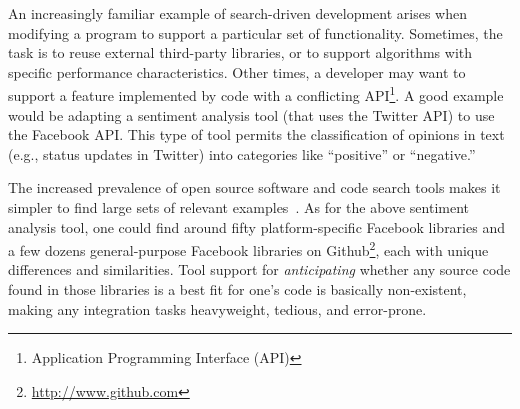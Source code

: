 An increasingly familiar example of search-driven development arises when modifying a program to support a particular set of functionality. Sometimes, the task is to reuse external third-party libraries, or to support algorithms with specific performance characteristics. Other times, a developer may want to support a feature implemented by code with a conflicting API\footnote{Application Programming Interface (API)}. A good example would be adapting a sentiment analysis tool (that uses the Twitter API) to use the Facebook API. This type of tool permits the classification of opinions in text (e.g., status updates in Twitter) into categories like ``positive'' or ``negative.'' 

The increased prevalence of open source software and code search tools makes it simpler to find large sets of relevant examples~\cite{Reiss:2009fu}. As for the above sentiment analysis tool, one could find around fifty platform-specific Facebook libraries and a few dozens general-purpose Facebook libraries on Github\footnote{\url{http://www.github.com}}, each with unique differences and similarities. Tool support for \emph{anticipating} whether any source code found in those libraries is a best fit for one's code is basically non-existent, making any integration tasks heavyweight, tedious, and error-prone. 


